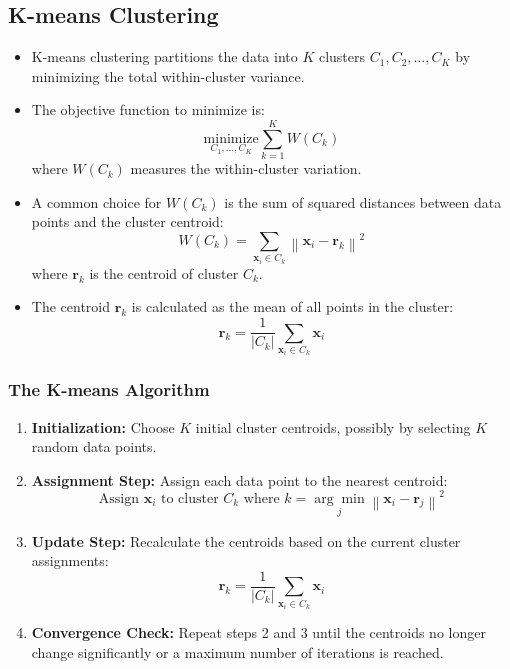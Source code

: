 \documentclass{article}
\begin{document}
\subsection{K-means Clustering}

\begin{itemize}
    \item K-means clustering partitions the data into $K$ clusters $C_1, C_2, \dots, C_K$ by minimizing the total within-cluster variance.
    \item The objective function to minimize is:
    \[
    \underset{C_1, \dots, C_K}{\text{minimize}} \sum_{k=1}^{K} W(C_k)
    \]
    where $W(C_k)$ measures the within-cluster variation.
    \item A common choice for $W(C_k)$ is the sum of squared distances between data points and the cluster centroid:
    \[
    W(C_k) = \sum_{\boldsymbol{x}_i \in C_k} \left\| \boldsymbol{x}_i - \boldsymbol{r}_k \right\|^2
    \]
    where $\boldsymbol{r}_k$ is the centroid of cluster $C_k$.
    \item The centroid $\boldsymbol{r}_k$ is calculated as the mean of all points in the cluster:
    \[
    \boldsymbol{r}_k = \frac{1}{|C_k|} \sum_{\boldsymbol{x}_i \in C_k} \boldsymbol{x}_i
    \]
\end{itemize}

\subsubsection{The K-means Algorithm}

\begin{enumerate}
    \item \textbf{Initialization:} Choose $K$ initial cluster centroids, possibly by selecting $K$ random data points.
    \item \textbf{Assignment Step:} Assign each data point to the nearest centroid:
    \[
    \text{Assign } \boldsymbol{x}_i \text{ to cluster } C_k \text{ where } k = \underset{j}{\arg\min} \left\| \boldsymbol{x}_i - \boldsymbol{r}_j \right\|^2
    \]
    \item \textbf{Update Step:} Recalculate the centroids based on the current cluster assignments:
    \[
    \boldsymbol{r}_k = \frac{1}{|C_k|} \sum_{\boldsymbol{x}_i \in C_k} \boldsymbol{x}_i
    \]
    \item \textbf{Convergence Check:} Repeat steps 2 and 3 until the centroids no longer change significantly or a maximum number of iterations is reached.
\end{enumerate}
\end{document}
